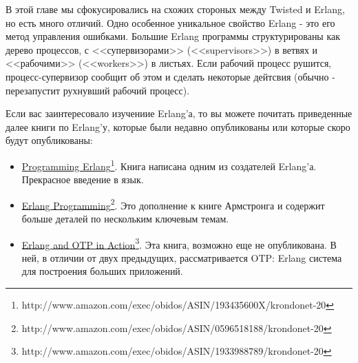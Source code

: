 В этой главе мы сфокусировались на схожих стороных между 
Twisted и Erlang, но есть много отличий. Одно особенное 
уникальное свойство Erlang - это его метод управления ошибками. 
Большие Erlang программы структурированы как дерево 
процессов, с <<супервизорами>> (<<supervisors>>)  в ветвях и <<рабочими>> (<<workers>>) 
в листьях. Если рабочий процесс рушится, процесс-супервизор сообщит об этом 
и сделать некоторые дейтсвия (обычно - перезапустит рухнувший рабочий процесс).


Если вас заинтересовало изучениие Erlang'а, то вы можете почитать приведенные 
далее книги по Erlang'у, которые были недавно опубликованы 
или которые скоро будут опубликованы: 

\begin{itemize}

\item \href{http://www.amazon.com/exec/obidos/ASIN/193435600X/krondonet-20}{Programming Erlang}\footnote[1]{http://www.amazon.com/exec/obidos/ASIN/193435600X/krondonet-20}. Книга написана одним из создателей Erlang'а. 
Прекрасное введение в язык.

\item \href{http://www.amazon.com/exec/obidos/ASIN/0596518188/krondonet-20}{Erlang Programming}\footnote[2]{http://www.amazon.com/exec/obidos/ASIN/0596518188/krondonet-20}. Это дополнение к книге Армстронга и 
содержит больше деталей по нескольким ключевым темам. 

\item \href{http://www.amazon.com/exec/obidos/ASIN/1933988789/krondonet-20}{Erlang and OTP in Action}\footnote[3]{http://www.amazon.com/exec/obidos/ASIN/1933988789/krondonet-20}. Эта книга, возможно еще не опубликована. В ней, в отличии 
от двух предыдущих, рассматривается OTP: Erlang система для построения больших приложений.

\end{itemize}


